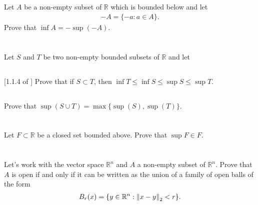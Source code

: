 \documentclass[11pt,letterpaper]{article}
\begin{document}
\section{}
Let $A$ be a non-empty subset of $\mathbb{R}$ which is bounded below and let
\begin{align}
    -A = \{-a:a\in A\}.
\end{align}
Prove that $\inf A = -\sup(-A)$.

\section{}
Let $S$ and $T$ be two non-empty bounded subsets of $\mathbb{R}$ and let

\subsection{} [1.1.4 of \cite{Lebl_23}] Prove that if $S \subset T$, then $\inf T \leq \inf S \leq \sup S \leq \sup T$.

\subsection{} Prove that $\sup(S\cup T) = \max\{\sup(S),\sup(T)\}$. 


\section{}
Let $F\subset \mathbb{R}$ be a closed set bounded above. Prove that $\sup F\in F$.

\section{}
Let's work with the vector space $\mathbb{R}^n$ and $A$ a non-empty subset of $\mathbb{R}^n$. Prove that $A$ is open if and only if it can be written as the union of a family of open balls of the form
\begin{align}
    B_r(x) = \{y\in \mathbb{R}^n: \left\Vert x-y \right\Vert_2< r\}. 
\end{align}
\end{document}
